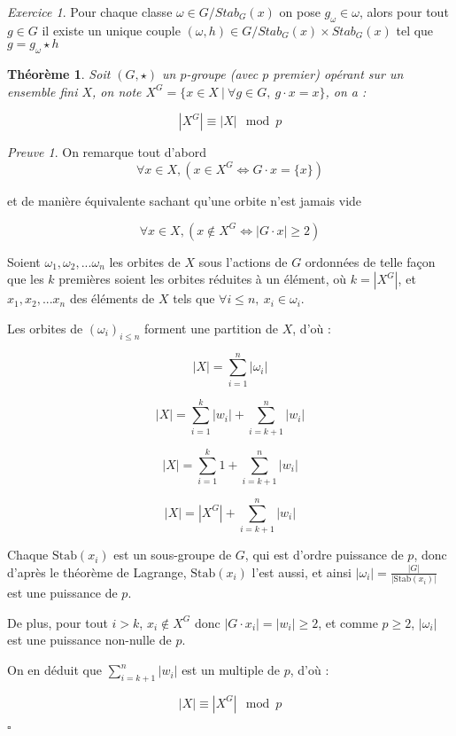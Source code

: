 \documentclass[]{article}
\newtheorem{mythm}{Théorème}
\theoremstyle{remark}
\newtheorem{myexer}{Exercice}
\newtheorem{myproof}{Preuve}
\theoremstyle{definition}
\newcommand{\cqfd}{
	\hfill$\square$
}
\begin{document}
\begin{myexer}
	Pour chaque classe $\omega \in G/Stab_G(x)$ on pose $g_\omega \in \omega$, alors pour tout $g \in G$ il existe un unique couple $(\omega, h) \in G/Stab_G(x) \times Stab_G(x)$ tel que $g = g_\omega \star h$
\end{myexer}

\begin{mythm}
	Soit $(G, \star)$ un $p$-groupe (avec $p$ premier) opérant sur un ensemble fini $X$, on note
	$X^G = \{x \in X ~ | ~ \forall g \in G, ~ g \cdot x = x\}$, on a :
	
	$$|X^G| \equiv |X| \mod p$$
\end{mythm}

\begin{myproof}
	On remarque tout d'abord
	$$\forall x \in X, (x \in X^G \Longleftrightarrow G \cdot x = \{x\})$$
	
	et de manière équivalente sachant qu'une orbite n'est jamais vide
	
	$$\forall x \in X, (x \notin X^G \Longleftrightarrow |G \cdot x| \geqslant 2)$$
	
	Soient $\omega_1, \omega_2, ...\omega_n$ les orbites de $X$ sous l'actions de $G$ ordonnées de telle façon que les $k$ premières soient les orbites réduites à un élément, où $k = \left|X^G\right|$, et $x_1, x_2, ...x_n$ des éléments de $X$ tels que $\forall i \leqslant n, ~ x_i \in \omega_i$.
	
	Les orbites de $(\omega_i)_{i \leqslant n}$ forment une partition de $X$, d'où :
	
	$$|X| = \sum_{i = 1}^{n} |\omega_i|$$
	
	$$|X| = \sum_{i = 1}^{k} |w_i| + \sum_{i = k + 1}^{n} |w_i|$$
	
	$$|X| = \sum_{i = 1}^{k} 1 + \sum_{i = k + 1}^{n} |w_i|$$
	
	$$|X| = \left|X^G\right| + \sum_{i = k + 1}^{n} |w_i|$$
	
	Chaque $\text{Stab}(x_i)$ est un sous-groupe de $G$, qui est d'ordre puissance de $p$, donc d'après le théorème de Lagrange, $\text{Stab}(x_i)$ l'est aussi, et ainsi $\displaystyle |\omega_i| = \frac{|G|}{|\text{Stab}(x_i)|}$ est une puissance de $p$.
	
	De plus, pour tout $i > k$, $x_i \notin X^G$ donc $|G \cdot x_i| = |w_i| \geqslant 2$, et comme $p \geqslant 2$, $|\omega_i|$ est une puissance non-nulle de $p$.
	
	On en déduit que $\displaystyle \sum_{i = k + 1}^{n} |w_i|$ est un multiple de $p$, d'où :
	
	$$|X| \equiv \left|X^G\right| \mod p$$
	
	\cqfd
\end{myproof}
\end{document}
